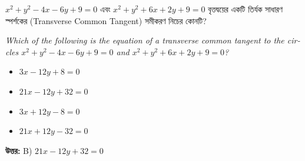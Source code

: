 \documentclass[12pt, a4paper]{article}
\begin{document}
\begin{tcolorbox}[questionbox={প্রশ্ন (Question) 23}]
    \noindent
    $x^2 + y^2 - 4x - 6y + 9 = 0$ এবং $x^2 + y^2 + 6x + 2y + 9 = 0$ বৃত্তদ্বয়ের একটি তির্যক সাধারণ স্পর্শকের (Transverse Common Tangent) সমীকরণ নিচের কোনটি?
    
    \vspace{0.8em}
    \begin{english}
    \noindent\textit{\color{darkgray}
    Which of the following is the equation of a transverse common tangent to the circles $x^2 + y^2 - 4x - 6y + 9 = 0$ and $x^2 + y^2 + 6x + 2y + 9 = 0$?
    }
    \end{english}
\end{tcolorbox}

\vspace{1em}
\begin{itemize}[label={}, leftmargin=1cm, itemsep=0.5em]
    \item[\textbf{A)}] $3x - 12y + 8 = 0$
    \item[\textbf{B)}] $21x - 12y + 32 = 0$
    \item[\textbf{C)}] $3x + 12y - 8 = 0$
    \item[\textbf{D)}] $21x + 12y - 32 = 0$
\end{itemize}

\vspace{0.5em}
\begin{tcolorbox}[answerbox]
    \textbf{\color{success} উত্তর:} B) $21x - 12y + 32 = 0$
\end{tcolorbox}
\vspace{1em}
\end{document}
